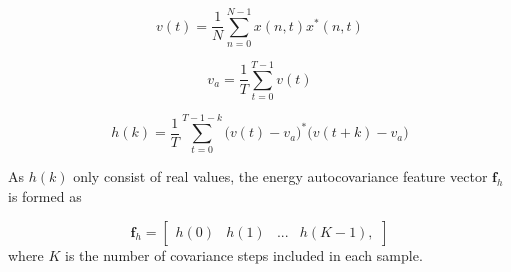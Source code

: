 \begin{equation}
	v(t) = \frac{1}{N}\sum_{n=0}^{N-1}x(n,t)x^*(n,t)
\end{equation}

\begin{equation} 
	v_a = \frac{1}{T}\sum_{t=0}^{T-1}v(t)
\end{equation}

\begin{equation}
	h(k) = \frac{1}{T}\sum_{t=0}^{T-1-k}\big(v(t) - v_a\big)^*\big(v(t+k) - v_a\big)
\end{equation}

As $h(k)$ only consist of real values, the energy autocovariance feature vector $\mathbf{f}_{h}$ is formed as

\begin{equation}
	\mathbf{f}_{h} = 
	\begin{bmatrix}
		h(0) & h(1) & ... & h(K-1),
	\end{bmatrix}
\end{equation}
where $K$ is the number of covariance steps included in each sample. 




